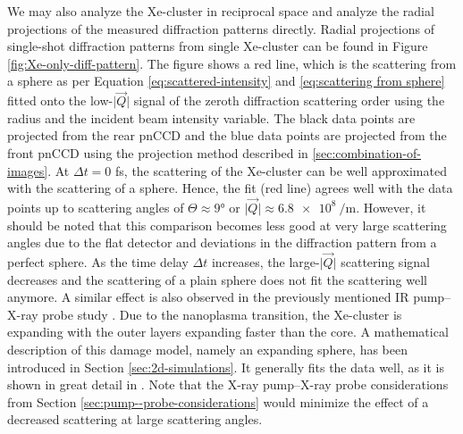 We may also analyze the Xe-cluster in reciprocal space and analyze the radial projections of the measured diffraction patterns directly. Radial projections of single-shot diffraction patterns from single Xe-cluster can be found in Figure \ref{fig:Xe-only-diff-pattern}. The figure shows a red line, which is the scattering from a sphere as per Equation \eqref{eq:scattered-intensity} and \eqref{eq:scattering from sphere} fitted onto the low-$\lvert\vec{Q}\rvert$ signal of the zeroth diffraction scattering order using the radius and the incident beam intensity variable. The black data points are projected from the rear pnCCD and the blue data points are projected from the front pnCCD using the projection method described in \ref{sec:combination-of-images}. At $\Delta t=0$ fs, the scattering of the Xe-cluster can be well approximated with the scattering of a sphere. Hence, the fit (red line) agrees well with the data points up to scattering angles of $\Theta \approx 9$° or $\lvert\vec{Q}\rvert\approx\SI{6.8e8}{\per\meter}$. However, it should be noted that this comparison becomes less good at very large scattering angles due to the flat detector \citep{Bostedt-2012-PRL} and deviations in the diffraction pattern from a perfect sphere. As the time delay $\Delta t$ increases, the large-$\lvert\vec{Q}\rvert$ scattering signal decreases and the scattering of a plain sphere does not fit the scattering well anymore. A similar effect is also observed in the previously mentioned IR pump--X-ray probe study \citep{Gorkhover-2016-NatPho}. Due to the nanoplasma transition, the Xe-cluster is expanding with the outer layers expanding faster than the core. A mathematical description of this damage model, namely an expanding sphere, has been introduced in Section \ref{sec:2d-simulations}. It generally fits the data well, as it is shown in great detail in \citep{Gorkhover-2016-NatPho,Gorkhover-2014-Thesis}. Note that the X-ray pump--X-ray probe considerations from Section \ref{sec:pump--probe-considerations} would minimize the effect of a decreased scattering at large scattering angles.
%
%
%
